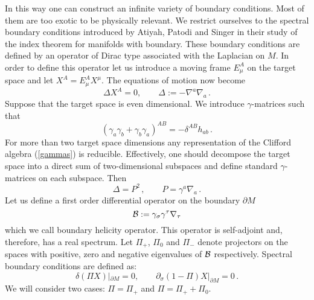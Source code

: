 \documentclass[a4paper,12pt,twoside]{article}
\begin{document}
In this way one can construct an infinite variety of boundary
conditions. Most of them are too exotic to be physically
relevant. We restrict ourselves to the spectral boundary
conditions introduced by Atiyah, Patodi and Singer \cite{Atiyah:1980jh}
in their study of the index theorem for manifolds with boundary.
These boundary conditions are defined by an operator of Dirac
type associated with the Laplacian on $M$. In order to define this operator
let us introduce a moving frame $E_\mu^A$ on the target space
and let $X^A=E_\mu^A X^\mu$. The equations of motion now become
\begin{equation}
\Delta X^A=0,\qquad \Delta :=-\nabla^a\nabla_a \,.
\label{eom}
\end{equation}
Suppose that the target space is even dimensional. We introduce
$\gamma$-matrices such that 
\begin{equation}
\left(\gamma_a\gamma_b +\gamma_b\gamma_a\right)^{AB}=-\delta^{AB}h_{ab}
\,. \label{gammas}
\end{equation}
For more than two target space dimensions any representation of
the Clifford algebra (\ref{gammas}) is reducible. Effectively,
one should decompose the target space into a direct sum of 
two-dimensional subspaces and define standard $\gamma$-matrices
on each subspace. Then
\begin{equation}
\Delta =P^2\,,\qquad P=\gamma^a\nabla_a \,. 
\label{DP}
\end{equation}
Let us define a first order differential operator on 
the boundary $\partial M$
\begin{equation}
{\cal B}:=\gamma_\sigma \gamma^\tau \nabla_\tau \label{helop}
\end{equation}
which we call boundary helicity operator. This operator is
self-adjoint and, therefore, has a real spectrum. Let 
$\Pi_+$, $\Pi_0$ and $\Pi_-$ denote projectors on the
spaces with positive, zero and negative eigenvalues of
${\cal B}$ respectively. Spectral boundary conditions
are defined as:
\begin{equation}
\delta (\Pi X)|_{\partial M}=0,\qquad 
\partial_\sigma (1-\Pi )X |_{\partial M}=0 \,.\label{isbc}
\end{equation}
We will consider two cases: $\Pi =\Pi_+$ and $\Pi =\Pi_++\Pi_0$.
\end{document}

